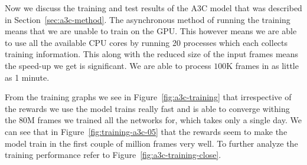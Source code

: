 Now we discuss the training and test results of the A3C model that was described in Section~\ref{sec:a3c-method}. The asynchronous method of running the training means that we are unable to train on the GPU. This however means we are able to use all the available CPU cores by running 20 processes which each collects training information. This along with the reduced size of the input frames means the speed-up we get is significant. We are able to process $100$K frames in as little as 1 minute.

\medskip
\noindent
From the training graphs we see in Figure~\ref{fig:a3c-training} that irrespective of the rewards we use the model trains really fast and is able to converge withing the $80$M frames we trained all the networks for, which takes only a single day. We can see that in Figure~\ref{fig:training-a3c-05} that the rewards seem to make the model train in the first couple of million frames very well. To further analyze the training performance refer to Figure~\ref{fig:a3c-training-close}.


